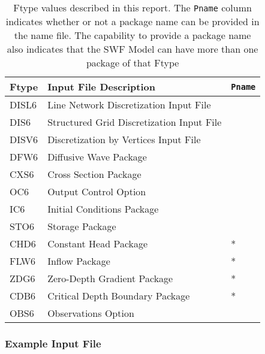 \begin{table}[H]
\caption{Ftype values described in this report.  The \texttt{Pname} column indicates whether or not a package name can be provided in the name file.  The capability to provide a package name also indicates that the SWF Model can have more than one package of that Ftype}
\small
\begin{center}
\begin{tabular*}{\columnwidth}{l l l}
\hline
\hline
Ftype & Input File Description & \texttt{Pname}\\
\hline
DISL6 & Line Network Discretization Input File \\
DIS6 & Structured Grid Discretization Input File \\
DISV6 & Discretization by Vertices Input File \\
DFW6 & Diffusive Wave Package \\ 
CXS6 & Cross Section Package \\ 
OC6 & Output Control Option \\
IC6 & Initial Conditions Package \\
STO6 & Storage Package \\
CHD6 & Constant Head Package & * \\ 
FLW6 & Inflow Package & * \\ 
ZDG6 & Zero-Depth Gradient Package & * \\ 
CDB6 & Critical Depth Boundary Package & * \\ 
OBS6 & Observations Option \\
\hline 
\end{tabular*}
\label{table:ftype}
\end{center}
\normalsize
\end{table}

\vspace{5mm}
\subsubsection{Example Input File}



